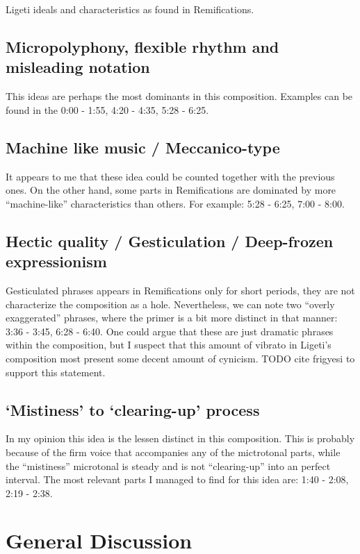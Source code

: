 \documentclass[a4paper,11pt]{article}
\begin{document}
Ligeti ideals and characteristics as found in Remifications.

\subsection*{Micropolyphony, flexible rhythm and misleading notation}

This ideas are perhaps the most dominants in this composition.
Examples can be found in the 0:00 - 1:55, 4:20 - 4:35, 5:28 - 6:25.

\subsection*{Machine like music / Meccanico-type}

It appears to me that these idea could be counted together with the previous ones.
On the other hand, some parts in Remifications are dominated by more ``machine-like'' characteristics than others.
For example: 5:28 - 6:25, 7:00 - 8:00.

\subsection*{Hectic quality / Gesticulation / Deep-frozen expressionism}

Gesticulated phrases appears in Remifications only for short periods, they are not characterize the composition as a hole.
Nevertheless, we can note two ``overly exaggerated'' phrases, where the primer is a bit more distinct in that manner: 3:36 - 3:45, 6:28 - 6:40.
One could argue that these are just dramatic phrases within the composition, but I suspect that this amount of vibrato in Ligeti's composition most present some decent amount of cynicism.
TODO cite frigyesi to support this statement.

\subsection*{‘Mistiness’ to ‘clearing-up’ process}

In my opinion this idea is the lessen distinct in this composition.
This is probably because of the firm voice that accompanies any of the mictrotonal parts, while the ``mistiness'' microtonal is steady and is not ``clearing-up'' into an perfect interval.
The most relevant parts I managed to find for this idea are: 1:40 - 2:08, 2:19 - 2:38.

\section{General Discussion}
\label{sec:general_discussion}

\printbibliography[title={Bibliography}]
\end{document}
